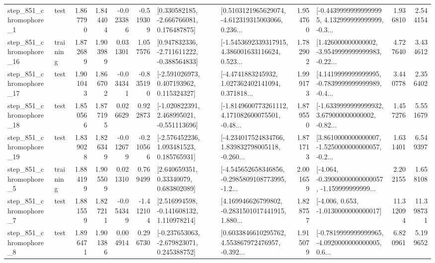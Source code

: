 \begin{tabular}{llrrrrllrlrr}
   step\_851\_chromophore\_1 &      test &      1.867790 &    1.844404 &     -0.023386 & -0.519309 &    [0.330582185, -2.666766081, 0.176487875] &  [0.5103121965629074, -4.612319315003066, 0.236... &       1.954760 &  [-0.44399999999999995, 4.132999999999999, -0.3... &            1.936810 &          2.544154 \\
  step\_851\_chromophore\_16 &  training &      1.872689 &    1.903989 &      0.031301 &  1.057576 &   [0.947832336, -2.711611222, -0.388564833] &  [-1.5453692339317915, 4.386001633116624, 0.523... &       1.782902 &  [1.426000000000002, -3.9549999999999983, -0.22... &            4.727640 &          3.434612 \\
  step\_851\_chromophore\_17 &      test &      1.901043 &    1.866702 &     -0.034341 & -0.835190 &    [-2.591026973, 0.407193962, 0.115324327] &  [-4.4741883245932, 1.027362402141094, 0.371818... &       1.999173 &  [4.1419999999999995, -0.7839999999999989, -0.4... &            3.440778 &          2.356402 \\
  step\_851\_chromophore\_18 &      test &      1.850566 &    1.877195 &      0.026629 &  0.922873 &   [-1.020822391, 2.468995021, -0.551113696] &  [-1.8149600773261112, 4.171082600075501, -0.48... &       1.879550 &  [-1.6339999999999932, 3.679000000000002, -0.82... &            1.457276 &          5.551679 \\
  step\_851\_chromophore\_19 &      test &      1.839028 &    1.826349 &     -0.012679 & -0.210566 &    [-2.576452236, 1.093481523, 0.185765931] &  [-4.234017524834766, 1.839832798005118, -0.260... &       1.871713 &  [3.8610000000000007, -1.5250000000000057, -0.2... &            1.631401 &          6.549397 \\
   step\_851\_chromophore\_5 &  training &      1.884199 &    1.905509 &      0.021310 &  0.769499 &      [2.640659351, 0.33340079, 0.683802089] &  [-4.545652658346856, -0.2985809108773995, -1.2... &       2.001659 &  [-4.064, -0.39000000000000057, -1.159999999999... &            2.202155 &          1.658108 \\
   step\_851\_chromophore\_7 &      test &      1.881559 &    1.827211 &     -0.054349 & -1.412104 &    [2.516994598, -0.141608132, 1.110978214] &  [4.169946626799802, -0.2831501017441915, 1.880... &       1.828757 &               [-4.006, 0.653, -1.0130000000000017] &           11.312094 &         11.398731 \\
   step\_851\_chromophore\_8 &      test &      1.896471 &    1.901386 &      0.004914 &  0.296730 &   [-0.237653063, -2.679823071, 0.245388752] &  [0.6033846610295762, 4.553867972476957, -0.392... &       1.915079 &  [-0.7819999999999965, -4.0920000000000005, 0.6... &            6.820961 &          5.199652 \\

\end{tabular}
